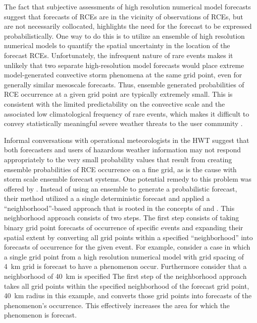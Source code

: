 The fact that subjective assessments of high resolution numerical model forecasts suggest that forecasts of RCEs are in the vicinity of observations of RCEs, but are not necessarily collocated, highlights the need for the forecast to be expressed probabilistically.
One way to do this is to utilize an ensemble of high resolution numerical models to quantify the spatial uncertainty in the location of the forecast RCEs.
Unfortunately, the infrequent nature of rare events makes it unlikely that two separate high-resolution model forecasts would place extreme model-generated convective storm phenomena at the same grid point, even for generally similar mesoscale forecasts.
Thus, ensemble generated probabilities of RCE occurrence at a given grid point are typically extremely small.
This is consistent with the limited predictability on the convective scale and the associated low climatological frequency of rare events, which makes it difficult to convey statistically meaningful severe weather threats to the user community \citep{Murphy1991}.


Informal conversations with operational meteorologists in the HWT suggest that both forecasters and users of hazardous weather information may not respond appropriately to the very small probability values that result from creating ensemble probabilities of RCE occurrence on a fine grid, as is the cause with storm scale ensemble forecast systems.
One potential remedy to this problem was offered by \cite{Sobash2011}.
Instead of using an ensemble to generate a probabilistic forecast, their method utilized a a single deterministic forecast and applied a ``neighborhood''-based approach that is rooted in the concepts of \cite{Theis2005} and \cite{Brooks1998}.
This neighborhood approach consists of two steps.
The first step consists of taking binary grid point forecasts of occurrence of specific events and expanding their spatial extent by converting all grid points within a specified ``neighborhood'' into forecasts of occurrence for the given event.
For example, consider a case in which a single grid point from a high resolution numerical model with grid spacing of \mbox{4 km} grid is forecast to have a phenomenon occur.
Furthermore consider that a neighborhood of \mbox{40 km} is specified
The first step of the neighborhood approach takes all grid points within the specified neighborhood of the forecast grid point, \mbox{40 km} radius in this example, and converts those grid points into forecasts of the phenomenon's occurrence.
This effectively increases the area for which the phenomenon is forecast.


